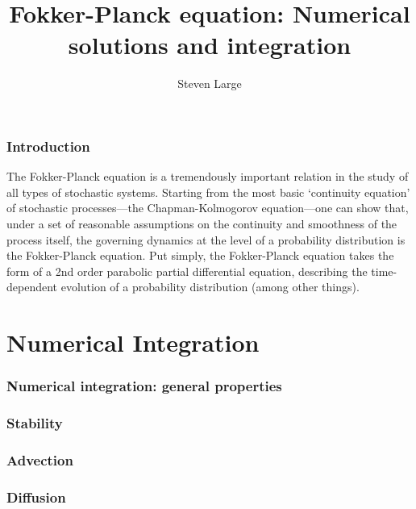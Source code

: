 \documentclass[15pt]{article}
\title{\sf Fokker-Planck equation: Numerical solutions and integration}
\author{\sf Steven Large}
\begin{document}
\maketitle
\tableofcontents
\pagebreak

\section{Introduction}

The Fokker-Planck equation is a tremendously important relation in the study of all types of stochastic systems. Starting from the most basic `continuity equation' of stochastic processes---the Chapman-Kolmogorov equation---one can show that, under a set of reasonable assumptions on the continuity and smoothness of the process itself, the governing dynamics at the level of a probability distribution is the Fokker-Planck equation.  Put simply, the Fokker-Planck equation takes the form of a 2nd order parabolic partial differential equation, describing the time-dependent evolution of a probability distribution (among other things).

\part{Numerical Integration}

    \section{Numerical integration: general properties}

    \section{Stability}

    \section{Advection}

    \section{Diffusion}
\end{document}
